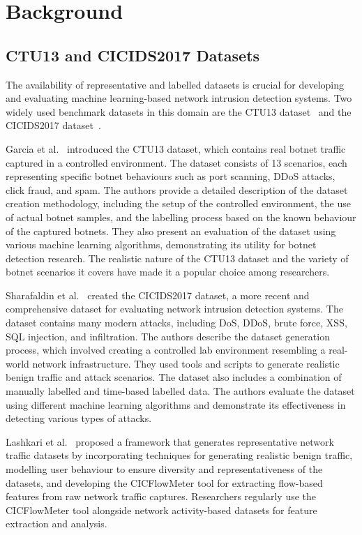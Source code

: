 \chapter{Background}

\section{CTU13 and CICIDS2017 Datasets}\label{sec:datasets}

The availability of representative and labelled datasets is crucial for developing and evaluating machine learning-based network intrusion detection systems. Two widely used benchmark datasets in this domain are the CTU13 dataset~\cite{garcia2014empirical} and the CICIDS2017 dataset~\cite{sharafaldin2018toward}.

Garcia et al.~\cite{garcia2014empirical} introduced the CTU13 dataset, which contains real botnet traffic captured in a controlled environment. The dataset consists of 13 scenarios, each representing specific botnet behaviours such as port scanning, DDoS attacks, click fraud, and spam. The authors provide a detailed description of the dataset creation methodology, including the setup of the controlled environment, the use of actual botnet samples, and the labelling process based on the known behaviour of the captured botnets. They also present an evaluation of the dataset using various machine learning algorithms, demonstrating its utility for botnet detection research. The realistic nature of the CTU13 dataset and the variety of botnet scenarios it covers have made it a popular choice among researchers.

Sharafaldin et al.~\cite{sharafaldin2018toward} created the CICIDS2017 dataset, a more recent and comprehensive dataset for evaluating network intrusion detection systems. The dataset contains many modern attacks, including DoS, DDoS, brute force, XSS, SQL injection, and infiltration. The authors describe the dataset generation process, which involved creating a controlled lab environment resembling a real-world network infrastructure. They used tools and scripts to generate realistic benign traffic and attack scenarios. The dataset also includes a combination of manually labelled and time-based labelled data. The authors evaluate the dataset using different machine learning algorithms and demonstrate its effectiveness in detecting various types of attacks.

Lashkari et al.~\cite{lashkari2017characterization} proposed a framework that generates representative network traffic datasets by incorporating techniques for generating realistic benign traffic, modelling user behaviour to ensure diversity and representativeness of the datasets, and developing the CICFlowMeter tool for extracting flow-based features from raw network traffic captures. Researchers regularly use the CICFlowMeter tool alongside network activity-based datasets for feature extraction and analysis.

